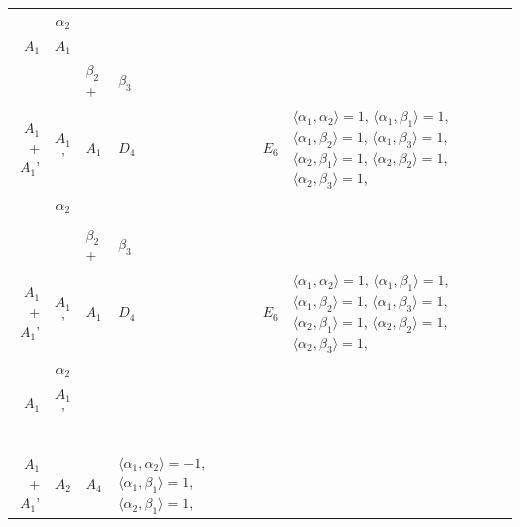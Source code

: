 \documentclass[12pt]{report}
\begin{document}
\begin{appendix}
{\begin{longtable}{rcl p{1cm}p{1cm}p{3cm} }
\\
\begin{tabular}{cc}$\alpha_1$+ & $\alpha_2$\\\tiny{ $A_1$ } & \tiny{ $A_1$ }\end{tabular} &\begin{tabular}{c} = \\~ \end{tabular} & \begin{tabular}{ccc}$\beta_1$+ & $\beta_2$+ & $\beta_3$\\\tiny{ $A_1$+$A_1$' } & \tiny{ $A_1$' } & \tiny{ $A_1$ }\end{tabular} & $D_4$ & $E_6$ & $\langle\alpha_1, \alpha_2\rangle=1$,  $\langle\alpha_1, \beta_1\rangle=1$, $\langle\alpha_1, \beta_2\rangle=1$, $\langle\alpha_1, \beta_3\rangle=1$, $\langle\alpha_2, \beta_1\rangle=1$, $\langle\alpha_2, \beta_2\rangle=1$, $\langle\alpha_2, \beta_3\rangle=1$, 
\\
\begin{tabular}{cc}$\alpha_1$+ & $\alpha_2$\\\tiny{  } & \tiny{  }\end{tabular} &\begin{tabular}{c} = \\~ \end{tabular} & \begin{tabular}{ccc}$\beta_1$+ & $\beta_2$+ & $\beta_3$\\\tiny{ $A_1$+$A_1$' } & \tiny{ $A_1$' } & \tiny{ $A_1$ }\end{tabular} & $D_4$ & $E_6$ & $\langle\alpha_1, \alpha_2\rangle=1$,  $\langle\alpha_1, \beta_1\rangle=1$, $\langle\alpha_1, \beta_2\rangle=1$, $\langle\alpha_1, \beta_3\rangle=1$, $\langle\alpha_2, \beta_1\rangle=1$, $\langle\alpha_2, \beta_2\rangle=1$, $\langle\alpha_2, \beta_3\rangle=1$, 
\\
\begin{tabular}{cc}$\alpha_1$+ & $\alpha_2$\\\tiny{ $A_1$ } & \tiny{ $A_1$' }\end{tabular} &\begin{tabular}{c} = \\~ \end{tabular} & \begin{tabular}{c}$\beta_1$\\\tiny{ $A_1$+$A_1$' }\end{tabular} & $A_2$ & $A_4$ & $\langle\alpha_1, \alpha_2\rangle=-1$,  $\langle\alpha_1, \beta_1\rangle=1$, $\langle\alpha_2, \beta_1\rangle=1$, 

\end{longtable}}
\end{appendix}
\end{document}
